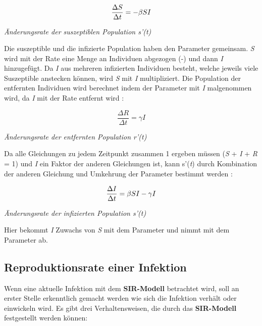 \documentclass[12pt]{scrartcl} %
\begin{document}
$$ \frac{\Delta S}{\Delta t} = -\beta\space S I $$
\begin{center}
\textsl{Änderungsrate der suszeptiblen Population s'(\textit{t})}
\end{center}

Die suszeptible und die infizierte Population haben den Parameter \textbeta \space gemeinsam. \textit{S} wird mit der Rate \textbeta \space eine Menge an Individuen abgezogen (-\textbeta) und dann \textit{I} hinzugefügt. Da \textit{I} aus mehreren infizierten Individuen besteht, welche jeweils \textbeta\space viele Suszeptible anstecken können, wird \textbeta\textit{S} mit \textit{I} multipliziert.
Die Population der entfernten Individuen wird berechnet indem der Parameter \textgamma\space mit \textit{I} malgenommen wird, da \textit{I} mit der Rate \textgamma\space entfernt wird \cite{7,3}:

$$ \frac{\Delta R}{\Delta t} = \gamma I $$
\begin{center}
\textsl{Änderungsrate der entfernten Population r'(\textit{t})}
\end{center}


Da alle Gleichungen zu jedem Zeitpunkt zusammen 1 ergeben müssen (\textit{S} + \textit{I} + \textit{R} = 1) und \textit{I} ein Faktor der anderen Gleichungen ist, kann s'(\textit{t}) durch Kombination der anderen Gleichung und Umkehrung der Parameter bestimmt werden
 \cite{3, 4}:

$$ \frac{\Delta I}{\Delta t} = \beta\space S I - \gamma I $$
\begin{center}
\textsl{Änderungsrate der infizierten Population s'(\textit{t})}
\end{center}

Hier bekommt \textit{I} Zuwachs von \textit{S} mit dem Parameter \textbeta\space und nimmt mit dem Parameter \textgamma\space ab.


\subsection{Reproduktionsrate einer Infektion}

Wenn eine aktuelle Infektion mit dem \textbf{SIR-Modell} betrachtet wird, soll an erster Stelle erkenntlich gemacht werden wie sich die Infektion verhält oder einwickeln wird. Es gibt drei Verhaltensweisen, die durch das \textbf{SIR-Modell} festgestellt werden können:\\
\end{document}

